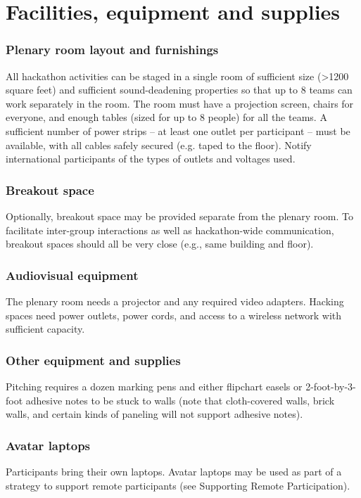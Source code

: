 \documentclass[11pt]{article}
\begin{document}
\newpage
\section{Facilities, equipment and supplies}
\subsubsection*{Plenary room layout and furnishings} 
All hackathon activities can be staged in a single room of sufficient size (>1200 square feet) and sufficient sound-deadening properties so that up to 8 teams can work separately in the room. The room must have a projection screen, chairs for everyone, and enough tables (sized for up to 8 people) for all the teams. A sufficient number of power strips – at least one outlet per participant – must be available, with all cables safely secured (e.g. taped to the floor). Notify international participants of the types of outlets and voltages used.

\subsubsection*{Breakout space} 
Optionally, breakout space may be provided separate from the plenary room.  To facilitate inter-group interactions as well as hackathon-wide communication, breakout spaces should all be very close (e.g., same building and floor).
\subsubsection*{Audiovisual equipment} 
The plenary room needs a projector and any required video adapters. Hacking spaces need power outlets, power cords, and access to a wireless network with sufficient capacity.  
\subsubsection*{Other equipment and supplies} 
Pitching requires a dozen marking pens and either flipchart easels or 2-foot-by-3-foot adhesive notes to be stuck to walls (note that cloth-covered walls, brick walls, and certain kinds of paneling will not support adhesive notes). 
\subsubsection*{Avatar laptops} 
Participants bring their own laptops. Avatar laptops may be used as part of a strategy to support remote participants (see Supporting Remote Participation). 
\end{document}
